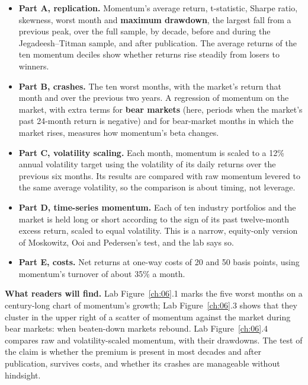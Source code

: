 \begin{itemize}
  \item \textbf{Part A, replication.} Momentum's average return, t-statistic, Sharpe ratio, skewness, worst month and \textbf{maximum drawdown}, the largest fall from a previous peak, over the full sample, by decade, before and during the Jegadeesh--Titman sample, and after publication. The average returns of the ten momentum deciles show whether returns rise steadily from losers to winners.
  \item \textbf{Part B, crashes.} The ten worst months, with the market's return that month and over the previous two years. A regression of momentum on the market, with extra terms for \textbf{bear markets} (here, periods when the market's past 24-month return is negative) and for bear-market months in which the market rises, measures how momentum's beta changes.
  \item \textbf{Part C, volatility scaling.} Each month, momentum is scaled to a 12\% annual volatility target using the volatility of its daily returns over the previous six months. Its results are compared with raw momentum levered to the same average volatility, so the comparison is about timing, not leverage.
  \item \textbf{Part D, time-series momentum.} Each of ten industry portfolios and the market is held long or short according to the sign of its past twelve-month excess return, scaled to equal volatility. This is a narrow, equity-only version of Moskowitz, Ooi and Pedersen's test, and the lab says so.
  \item \textbf{Part E, costs.} Net returns at one-way costs of 20 and 50 basis points, using momentum's turnover of about 35\% a month.
\end{itemize}

\textbf{What readers will find.} Lab Figure~\ref{ch:06}.1 marks the five worst months on a century-long chart of momentum's growth; Lab Figure~\ref{ch:06}.3 shows that they cluster in the upper right of a scatter of momentum against the market during bear markets: when beaten-down markets rebound. Lab Figure~\ref{ch:06}.4 compares raw and volatility-scaled momentum, with their drawdowns. The test of the claim is whether the premium is present in most decades and after publication, survives costs, and whether its crashes are manageable without hindsight.

